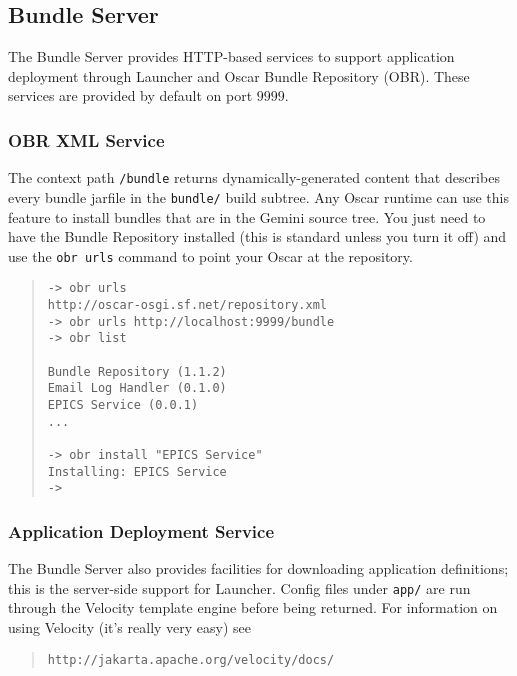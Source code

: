 \documentclass{report}
\begin{document}
\subsection{Bundle Server}
\label{bundle-server}
The Bundle Server provides HTTP-based services to support application
deployment through Launcher and Oscar Bundle Repository (OBR). These services
are provided by default on port $9999$.

\subsubsection{OBR XML Service}
The context path {\tt /bundle} returns dynamically-generated content that
describes every bundle jarfile in the {\tt bundle/} build subtree. Any Oscar
runtime can use this feature to install bundles that are in the Gemini source
tree. You just need to have the Bundle Repository installed (this is standard
unless you turn it off) and use the {\tt obr urls} command to point your Oscar
at the repository.

\begin{quote}\begin{scriptsize}\begin{verbatim}    
-> obr urls
http://oscar-osgi.sf.net/repository.xml
-> obr urls http://localhost:9999/bundle
-> obr list

Bundle Repository (1.1.2)
Email Log Handler (0.1.0)
EPICS Service (0.0.1)
...

-> obr install "EPICS Service"
Installing: EPICS Service
-> 
\end{verbatim}\end{scriptsize}\end{quote}


\subsubsection{Application Deployment Service}

The Bundle Server also provides facilities for downloading application definitions; 
this is the server-side support for Launcher. Config files under {\tt app/} are run
through the Velocity template engine before being returned. For information on
using Velocity (it's really very easy) see

\begin{quote}\begin{scriptsize}\begin{verbatim}
http://jakarta.apache.org/velocity/docs/
\end{verbatim}\end{scriptsize}\end{quote}
\end{document}
